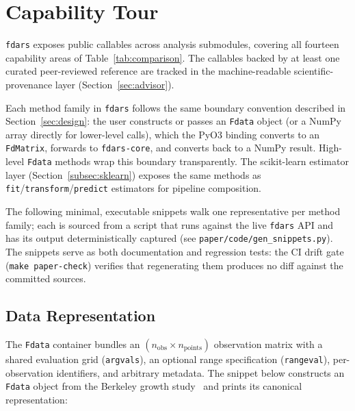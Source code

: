 \section{Capability Tour}
\label{sec:capabilities}

\texttt{fdars} exposes \npubliccallables{} public callables across
\nsubmodules{} analysis submodules, covering all fourteen capability areas of
Table~\ref{tab:comparison}.
The \ncoverage{} callables backed by at least one curated peer-reviewed
reference are tracked in the machine-readable scientific-provenance layer
(Section~\ref{sec:advisor}).

Each method family in \texttt{fdars} follows the same boundary convention
described in Section~\ref{sec:design}: the user constructs or passes an
\texttt{Fdata} object (or a NumPy array directly for lower-level calls), which
the PyO3 binding converts to an \texttt{FdMatrix}, forwards to
\texttt{fdars-core}, and converts back to a NumPy result.  High-level
\texttt{Fdata} methods wrap this boundary transparently.  The scikit-learn
estimator layer (Section~\ref{subsec:sklearn}) exposes the same methods as
\texttt{fit}/\texttt{transform}/\texttt{predict} estimators for pipeline
composition.

The following minimal, executable snippets walk one representative per method
family; each is sourced from a script that runs against the live \texttt{fdars}
API and has its output deterministically captured (see
\texttt{paper/code/gen\_snippets.py}).  The snippets serve as both
documentation and regression tests: the CI drift gate (\texttt{make
paper-check}) verifies that regenerating them produces no diff against the
committed sources.

\subsection{Data Representation}

The \texttt{Fdata} container bundles an $(n_\text{obs} \times n_\text{points})$
observation matrix with a shared evaluation grid (\texttt{argvals}), an optional
range specification (\texttt{rangeval}), per-observation identifiers, and
arbitrary metadata.
The snippet below constructs an \texttt{Fdata} object from the Berkeley growth
study~\citep{tuddenham_snyder_1954,ramsay_silverman_2005} and prints its canonical representation:

